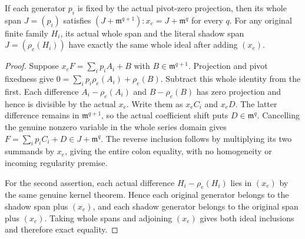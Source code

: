 \begin{theorem}
\label{hir:actual-pivot-fixed-fibre-whole-colons}
\leanok
If each generator $p_i$ is fixed by the actual pivot-zero projection,
then its whole span $J=(p_i)$ satisfies
$(J+\mathfrak m^{q+1}):x_e=J+\mathfrak m^q$ for every $q$.
For any original finite family $H_i$, its actual whole span and the
literal shadow span $J=(\rho_e(H_i))$ have exactly the same whole
ideal after adding $(x_e)$.
\end{theorem}
\begin{proof}
Suppose $x_eF=\sum_i p_iA_i+B$ with
$B\in\mathfrak m^{q+1}$. Projection and pivot fixedness give
$0=\sum_i p_i\rho_e(A_i)+\rho_e(B)$.
Subtract this whole identity from the first. Each difference
$A_i-\rho_e(A_i)$ and $B-\rho_e(B)$ has zero projection and hence
is divisible by the actual $x_e$. Write them as $x_eC_i$ and $x_eD$.
The latter difference remains in $\mathfrak m^{q+1}$, so the actual
coefficient shift puts $D\in\mathfrak m^q$.
Cancelling the genuine nonzero variable in the whole series domain
gives $F=\sum_i p_iC_i+D\in J+\mathfrak m^q$.
The reverse inclusion follows by multiplying its two summands by
$x_e$, giving the entire colon equality, with no homogeneity or
incoming regularity premise.

For the second assertion, each actual difference
$H_i-\rho_e(H_i)$ lies in $(x_e)$ by the same genuine kernel theorem.
Hence each original generator belongs to the shadow span plus
$(x_e)$, and each shadow generator belongs to the original span plus
$(x_e)$. Taking whole spans and adjoining $(x_e)$ gives both ideal
inclusions and therefore exact equality.
\end{proof}

